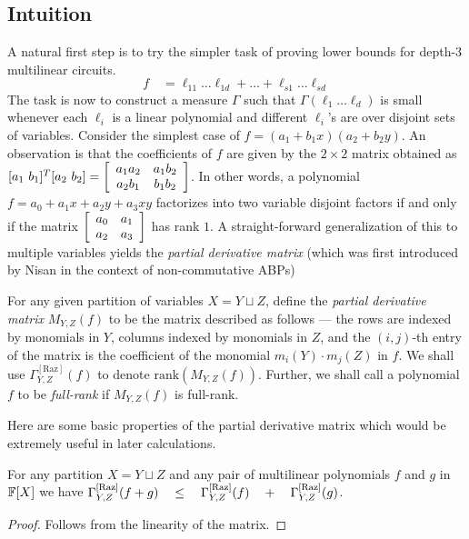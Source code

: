 \subsection*{Intuition}

A natural first step is to try the simpler task of proving lower bounds for depth-$3$ multilinear circuits. 
$$
f \quad = \ell_{11} \dots \ell_{1d} + \dots + \ell_{s1}\dots \ell_{sd}
$$
The task is now to construct a measure $\Gamma$ such that $\Gamma(\ell_1\dots \ell_d)$ is small whenever each $\ell_i$ is a linear polynomial and different $\ell_i$'s are over disjoint sets of variables. Consider the simplest case of $f = (a_1  + b_1x)(a_2  + b_2y)$. An observation is that the coefficients of $f$ are given by the $2\times 2$ matrix obtained as $[a_1\ b_1]^T [a_2\ b_2] = \left[\begin{array}{cc} a_1a_2 & a_1b_2\\ a_2 b_1 & b_1 b_2\end{array}\right]$. In other words, a polynomial $f = a_0 + a_1x + a_2y + a_3xy$ factorizes into two variable disjoint factors if and only if the matrix $\left[\begin{array}{cc} a_0 & a_1\\ a_2 & a_3\end{array}\right]$ has rank $1$. A straight-forward generalization of this to multiple variables yields the \emph{partial derivative matrix} (which was first introduced by Nisan \cite{nis91} in the context of non-commutative ABPs)\\

\begin{definition}
For any given partition of variables $X = Y \sqcup Z$, define the \emph{partial derivative matrix} $M_{Y,Z}(f)$ to be the matrix described as follows --- the rows are indexed by monomials in $Y$, columns indexed by monomials in $Z$, and the $(i,j)$-th entry of the matrix is the coefficient of the monomial $m_i(Y)\cdot m_j(Z)$ in $f$. We shall use $\Gamma^{\mathrm{[Raz]}}_{Y,Z}(f)$ to denote $\mathrm{rank}(M_{Y,Z}(f))$. Further, we shall call a polynomial $f$ to be \emph{full-rank} if $M_{Y,Z}(f)$ is full-rank.
\end{definition}

Here are some basic properties of the partial derivative matrix which would be extremely useful in later calculations.

\begin{observation}\label{obs:pdm-subadditivity}
	For any partition $X = Y \sqcup Z$ and any pair of multilinear 
	polynomials $f$ and $g$ in $\mathbb{F}[X]$ we have 
$\Gamma^{\mathrm{[Raz]}}_{Y,Z}(f+g) \quad \leq \quad \Gamma^{\mathrm{[Raz]}}_{Y,Z}(f) \quad + \quad \Gamma^{\mathrm{[Raz]}}_{Y,Z}(g)$.
\end{observation}
\begin{proof}
Follows from the linearity of the matrix. 
\end{proof}

